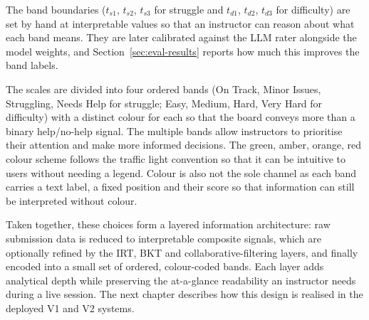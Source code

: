 The band boundaries ($t_{s1}$, $t_{s2}$, $t_{s3}$ for struggle and $t_{d1}$, $t_{d2}$, $t_{d3}$ for difficulty) are set by hand at interpretable values so that an instructor can reason about what each band means. They are later calibrated against the LLM rater alongside the model weights, and Section~\ref{sec:eval-results} reports how much this improves the band labels.

The scales are divided into four ordered bands (On Track, Minor Issues, Struggling, Needs Help for struggle; Easy, Medium, Hard, Very Hard for difficulty) with a distinct colour for each so that the board conveys more than a binary help/no-help signal. 
The multiple bands allow instructors to prioritise their attention and make more informed decisions.
The green, amber, orange, red colour scheme follows the traffic light convention so that it can be intuitive to users without needing a legend. 
Colour is also not the sole channel as each band carries a text label, a fixed position and their score so that information can still be interpreted without colour.

Taken together, these choices form a layered information architecture: raw submission data is reduced to interpretable composite signals, which are optionally refined by the IRT, BKT and collaborative-filtering layers, and finally encoded into a small set of ordered, colour-coded bands. 
Each layer adds analytical depth while preserving the at-a-glance readability an instructor needs during a live session. The next chapter describes how this design is realised in the deployed V1 and V2 systems.

